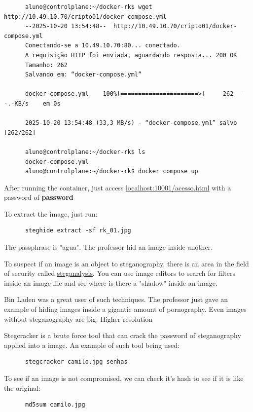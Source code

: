 \documentclass{article}
\begin{document}
\begin{verbatim}
      aluno@controlplane:~/docker-rk$ wget http://10.49.10.70/cripto01/docker-compose.yml
      --2025-10-20 13:54:48--  http://10.49.10.70/cripto01/docker-compose.yml
      Conectando-se a 10.49.10.70:80... conectado.
      A requisição HTTP foi enviada, aguardando resposta... 200 OK
      Tamanho: 262
      Salvando em: “docker-compose.yml”

      docker-compose.yml    100%[======================>]     262  --.-KB/s    em 0s      

      2025-10-20 13:54:48 (33,3 MB/s) - “docker-compose.yml” salvo [262/262]

      aluno@controlplane:~/docker-rk$ ls
      docker-compose.yml
      aluno@controlplane:~/docker-rk$ docker compose up
\end{verbatim}

After running the container, just access \href{http://localhost:10001/acesso.html}{localhost:10001/acesso.html} with a password of \textbf{password}

To extract the image, just run:

\begin{verbatim}
      steghide extract -sf rk_01.jpg
\end{verbatim}

The passphrase is "agua". The professor hid an image inside another.

To suspect if an image is an object to steganography, there is an area in the field of security called \href{https://en.wikipedia.org/wiki/Steganalysis}{steganalysis}. You can use image editors to search for filters inside an image file and see where is there a "shadow" inside an image.

Bin Laden was a great user of such techniques. The professor just gave an example of hiding images inside a gigantic amount of pornography. Even images without steganography are big. Higher resolution 

Stegcracker is a brute force tool that can crack the password of steganography applied into a image. An example of such tool being used:

\begin{verbatim}
      stegcracker camilo.jpg senhas
\end{verbatim}

To see if an image is not compromised, we can check it's hash to see if it is like the original:
\begin{verbatim}
      md5sum camilo.jpg
\end{verbatim}
      


\end{document}
